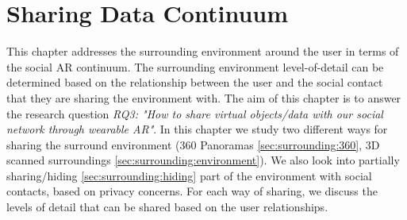 \chapter{Sharing Data Continuum} %
\label{ch:data} %

This chapter addresses the surrounding environment around the user in terms of the social AR continuum. The surrounding environment level-of-detail can be determined based on the relationship between the user and the social contact that they are sharing the environment with.  The aim of this chapter is to answer the research question \textit{RQ3: "How to share virtual objects/data with our social network through wearable AR"}. In this chapter we study two different ways for sharing the surround environment (360 Panoramas \ref{sec:surrounding:360}, 3D scanned surroundings \ref{sec:surrounding:environment}). We also look into partially sharing/hiding \ref{sec:surrounding:hiding} part of the environment with social contacts, based on privacy concerns. For each way of sharing, we discuss the levels of detail that can be shared based on the user relationships. 





